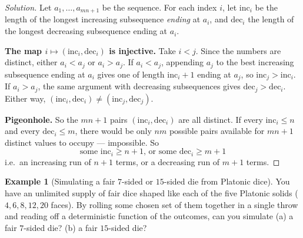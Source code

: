 \documentclass[11pt]{article}
\theoremstyle{definition}
\newtheorem{example}{Example}[section]
\begin{document}
\begin{proof}[Solution]
Let $a_1,\dots,a_{mn+1}$ be the sequence. For each index $i$, let $\mathrm{inc}_i$ be the length of the longest increasing subsequence \emph{ending} at $a_i$, and $\mathrm{dec}_i$ the length of the longest decreasing subsequence ending at $a_i$.

\textbf{The map $i\mapsto(\mathrm{inc}_i,\mathrm{dec}_i)$ is injective.} Take $i<j$. Since the numbers are distinct, either $a_i<a_j$ or $a_i>a_j$. If $a_i<a_j$, appending $a_j$ to the best increasing subsequence ending at $a_i$ gives one of length $\mathrm{inc}_i+1$ ending at $a_j$, so $\mathrm{inc}_j>\mathrm{inc}_i$. If $a_i>a_j$, the same argument with decreasing subsequences gives $\mathrm{dec}_j>\mathrm{dec}_i$. Either way, $(\mathrm{inc}_i,\mathrm{dec}_i)\neq(\mathrm{inc}_j,\mathrm{dec}_j)$.

\textbf{Pigeonhole.} So the $mn+1$ pairs $(\mathrm{inc}_i,\mathrm{dec}_i)$ are all distinct. If every $\mathrm{inc}_i\le n$ and every $\mathrm{dec}_i\le m$, there would be only $nm$ possible pairs available for $mn+1$ distinct values to occupy — impossible. So
\[
\boxed{\text{some } \mathrm{inc}_i\ge n+1 \text{, or some } \mathrm{dec}_i\ge m+1}
\]
i.e.\ an increasing run of $n+1$ terms, or a decreasing run of $m+1$ terms.
\end{proof}

\begin{example}[Simulating a fair $7$-sided or $15$-sided die from Platonic dice]
You have an unlimited supply of fair dice shaped like each of the five Platonic solids ($4,6,8,12,20$ faces). By rolling some chosen set of them together in a single throw and reading off a deterministic function of the outcomes, can you simulate (a) a fair $7$-sided die? (b) a fair $15$-sided die?
\end{example}
\end{document}
